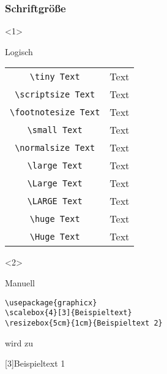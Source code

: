 \begin{frame}[fragile]
  \frametitle{Schriftgröße}

  \begin{onlyenv}<1>
    \begin{block}{Logisch}
      \centering
      \begin{tabular}[c]{cc}
        \lstinline!\tiny Text!         & \tiny Text \\
        \lstinline!\scriptsize Text!   & \scriptsize Text \\
        \lstinline!\footnotesize Text! & \footnotesize Text \\
        \lstinline!\small Text!        & \small Text \\
        \lstinline!\normalsize Text!   & \normalsize Text \\
        \lstinline!\large Text!        & \large Text \\
        \lstinline!\Large Text!        & \Large Text \\
        \lstinline!\LARGE Text!        & \LARGE Text \\
        \lstinline!\huge Text!         & \huge Text \\
        \lstinline!\Huge Text!         & \Huge Text \\
      \end{tabular}
    \end{block}
  \end{onlyenv}

  \begin{onlyenv}<2>
    \begin{block}{Manuell}

\begin{lstlisting}
\usepackage{graphicx}
\scalebox{4}[3]{Beispieltext}
\resizebox{5cm}{1cm}{Beispieltext 2}
\end{lstlisting}

      wird zu

      \bigskip

      \scalebox{4}[3]{Beispieltext 1} 

    \end{block}
  \end{onlyenv}

\end{frame}

